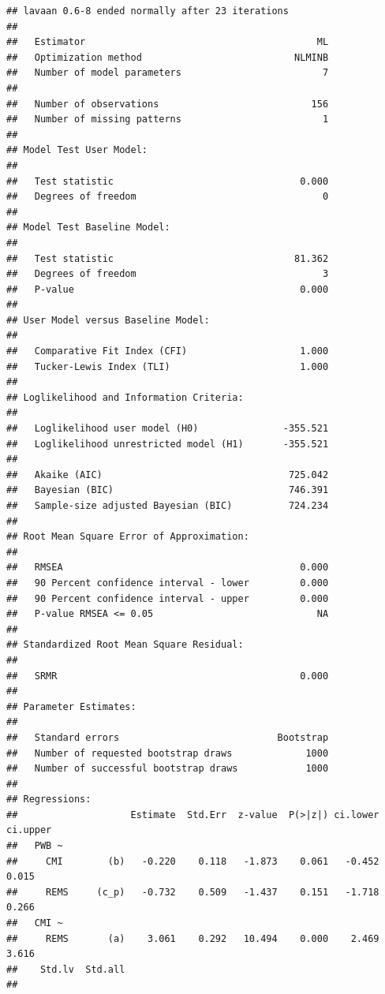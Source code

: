 \documentclass[
  english,
]{book}
\begin{document}
\begin{verbatim}
## lavaan 0.6-8 ended normally after 23 iterations
## 
##   Estimator                                         ML
##   Optimization method                           NLMINB
##   Number of model parameters                         7
##                                                       
##   Number of observations                           156
##   Number of missing patterns                         1
##                                                       
## Model Test User Model:
##                                                       
##   Test statistic                                 0.000
##   Degrees of freedom                                 0
## 
## Model Test Baseline Model:
## 
##   Test statistic                                81.362
##   Degrees of freedom                                 3
##   P-value                                        0.000
## 
## User Model versus Baseline Model:
## 
##   Comparative Fit Index (CFI)                    1.000
##   Tucker-Lewis Index (TLI)                       1.000
## 
## Loglikelihood and Information Criteria:
## 
##   Loglikelihood user model (H0)               -355.521
##   Loglikelihood unrestricted model (H1)       -355.521
##                                                       
##   Akaike (AIC)                                 725.042
##   Bayesian (BIC)                               746.391
##   Sample-size adjusted Bayesian (BIC)          724.234
## 
## Root Mean Square Error of Approximation:
## 
##   RMSEA                                          0.000
##   90 Percent confidence interval - lower         0.000
##   90 Percent confidence interval - upper         0.000
##   P-value RMSEA <= 0.05                             NA
## 
## Standardized Root Mean Square Residual:
## 
##   SRMR                                           0.000
## 
## Parameter Estimates:
## 
##   Standard errors                            Bootstrap
##   Number of requested bootstrap draws             1000
##   Number of successful bootstrap draws            1000
## 
## Regressions:
##                    Estimate  Std.Err  z-value  P(>|z|) ci.lower ci.upper
##   PWB ~                                                                 
##     CMI        (b)   -0.220    0.118   -1.873    0.061   -0.452    0.015
##     REMS     (c_p)   -0.732    0.509   -1.437    0.151   -1.718    0.266
##   CMI ~                                                                 
##     REMS       (a)    3.061    0.292   10.494    0.000    2.469    3.616
##    Std.lv  Std.all
##                   

\end{verbatim}
\end{document}

